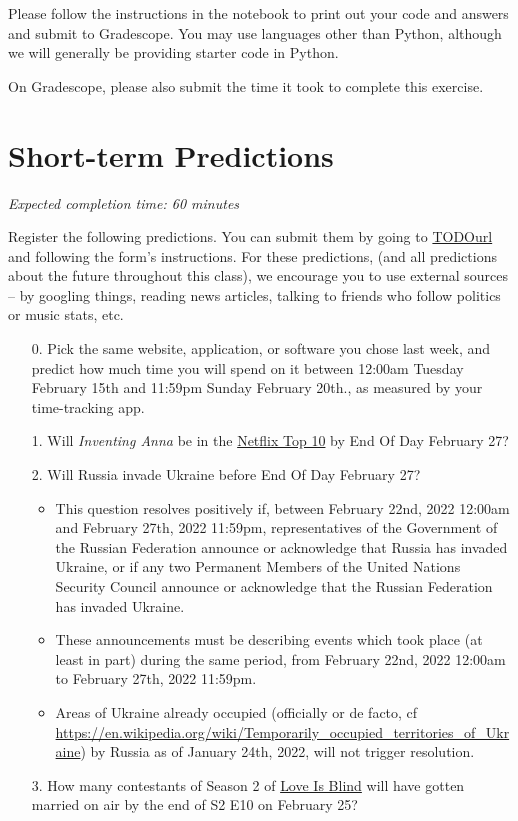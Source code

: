 \documentclass[11pt]{article}
\begin{document}
Please follow the instructions in the notebook to print out your code and answers and submit to Gradescope. You may use languages other than Python, although we will generally be providing starter code in Python.

On Gradescope, please also submit the time it took to complete this exercise.

\section*{Short-term Predictions}

\emph{Expected completion time: 60 minutes}

Register the following predictions. You can submit them by going to \url{TODOurl} and following the form's instructions. For these predictions, (and all predictions about the future throughout this class), we encourage you to use external sources -- by googling things, reading news articles, talking to friends who follow politics or music stats, etc.

\begin{enumerate}
	\item[0.] Pick the same website, application, or software you chose last week, and predict how much time you will spend on it between 12:00am Tuesday February 15th and 11:59pm Sunday February 20th., as measured by your time-tracking app.

	\item[1.]  Will \emph{Inventing Anna} be in the \href{https://www.the-numbers.com/netflix-top-10}{Netflix Top 10} by End Of Day February 27?
	\item[2.]  Will Russia invade Ukraine before End Of Day February 27?
	\begin{itemize}
		\item This question resolves positively if, between February 22nd, 2022 12:00am and February 27th, 2022 11:59pm, representatives of the Government of the Russian Federation announce or acknowledge that Russia has invaded Ukraine, or if any two Permanent Members of the United Nations Security Council announce or acknowledge that the Russian Federation has invaded Ukraine. 

		\item These announcements must be describing events which took place (at least in part) during the same period, from February 22nd, 2022 12:00am to February 27th, 2022 11:59pm. 
		
		\item Areas of Ukraine already occupied (officially or de facto, cf \url{https://en.wikipedia.org/wiki/Temporarily_occupied_territories_of_Ukraine}) by Russia as of January 24th, 2022, will not trigger resolution.
	\end{itemize} 
	\item[3.] How many contestants of Season 2 of \href{https://en.wikipedia.org/wiki/Love_Is_Blind_(TV_series)}{Love Is Blind} will have gotten married on air by the end of S2 E10 on February 25?
\end{enumerate}
\end{document}
